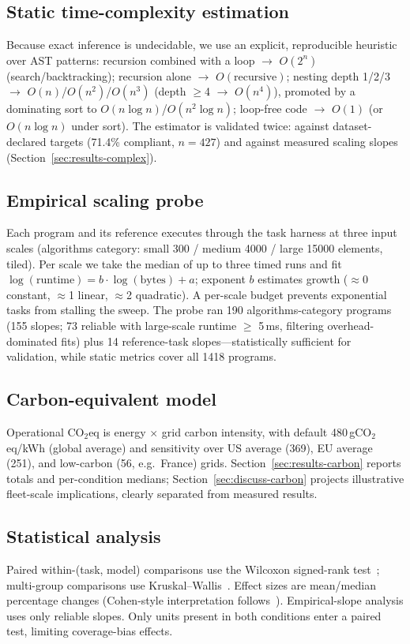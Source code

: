 \documentclass[journal]{IEEEtran}
\begin{document}
\subsection{Static time-complexity estimation}
Because exact inference is undecidable, we use an explicit, reproducible
heuristic over AST patterns: recursion combined with a loop $\rightarrow$
$O(2^n)$ (search/backtracking); recursion alone $\rightarrow$
$O(\text{recursive})$; nesting depth 1/2/3 $\rightarrow$
$O(n)$/$O(n^2)$/$O(n^3)$ (depth $\geq$4 $\rightarrow$ $O(n^4)$), promoted by
a dominating sort to $O(n\log n)$/$O(n^2\log n)$; loop-free code
$\rightarrow$ $O(1)$ (or $O(n\log n)$ under sort). The estimator is
validated twice: against dataset-declared targets (71.4\% compliant,
$n{=}427$) and against measured scaling slopes
(Section~\ref{sec:results-complex}).

\subsection{Empirical scaling probe}
Each program and its reference executes through the task harness at three
input scales (algorithms category: small 300 / medium 4000 / large 15000
elements, tiled). Per scale we take the median of up to three timed runs
and fit $\log(\text{runtime}) = b\cdot\log(\text{bytes}) + a$; exponent $b$
estimates growth ($\approx$0 constant, $\approx$1 linear, $\approx$2
quadratic). A per-scale budget prevents exponential tasks from stalling the
sweep. The probe ran 190 algorithms-category programs (155 slopes; 73
reliable with large-scale runtime $\geq$ 5\,ms, filtering
overhead-dominated fits) plus 14 reference-task slopes---statistically
sufficient for validation, while static metrics cover all 1418 programs.

\subsection{Carbon-equivalent model}
Operational CO$_{2}$eq is energy $\times$ grid carbon intensity, with
default 480\,gCO$_{2}$eq/kWh (global average) and sensitivity over US
average (369), EU average (251), and low-carbon (56, e.g.\ France) grids.
Section~\ref{sec:results-carbon} reports totals and per-condition medians;
Section~\ref{sec:discuss-carbon} projects illustrative fleet-scale
implications, clearly separated from measured results.

\subsection{Statistical analysis}
Paired within-(task, model) comparisons use the Wilcoxon signed-rank
test~\cite{wilcoxon1945}; multi-group comparisons use
Kruskal--Wallis~\cite{kruskal1952}. Effect sizes are mean/median percentage
changes (Cohen-style interpretation follows~\cite{cohen1988}).
Empirical-slope analysis uses only reliable slopes. Only units present in
both conditions enter a paired test, limiting coverage-bias effects.
\end{document}
